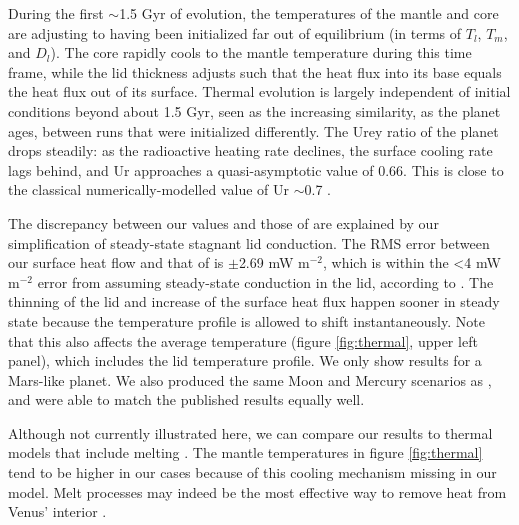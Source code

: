 During the first $\sim$1.5 Gyr of evolution, the temperatures of the mantle and core are adjusting to having been initialized far out of equilibrium (in terms of $T_l$, $T_m$, and $D_l$). The core rapidly cools to the mantle temperature during this time frame, while the lid thickness adjusts such that the heat flux into its base equals the heat flux out of its surface. Thermal evolution is largely independent of initial conditions beyond about 1.5 Gyr, seen as the increasing similarity, as the planet ages, between runs that were initialized differently. The Urey ratio of the planet drops steadily: as the radioactive heating rate declines, the surface cooling rate lags behind, and Ur approaches a quasi-asymptotic value of 0.66. This is close to the classical numerically-modelled value of Ur $\sim$0.7 \citep{Schubert1980, McKenzie1981}.


The discrepancy between our values and those of \citet{Thiriet2019} are explained by our simplification of steady-state stagnant lid conduction. The RMS error between our surface heat flow and that of  \citet{Thiriet2019} is $\pm$2.69 mW m$^{-2}$, which is within the \textless4 mW m$^{-2}$ error from assuming steady-state conduction in the lid, according to \citet{Thiriet2019}. The thinning of the lid and increase of the surface heat flux happen sooner in steady state because the temperature profile is allowed to shift instantaneously. Note that this also affects the average temperature (figure \ref{fig:thermal}, upper left panel), which includes the lid temperature profile. We only show results for a Mars-like planet. We also produced the same Moon and Mercury scenarios as \citet{Thiriet2019}, and were able to match the published results equally well.  



Although not currently illustrated here, we can compare our results to thermal models that include melting \citep[e.g.,][]{Hauck2002, Kite2009}. The mantle temperatures in figure \ref{fig:thermal} tend to be higher in our cases because of this cooling mechanism missing in our model. Melt processes may indeed be the most effective way to remove heat from Venus' interior \citep{Armann2012}.

